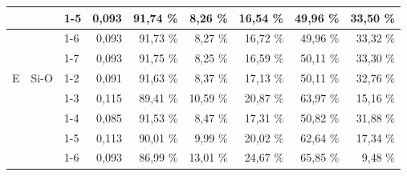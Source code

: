 \documentclass[
  digital, %
  table,   %
  lof,     %
  lot,     %
  oneside,
]{fithesis3}
\begin{document}
\begin{table}
\begin{center}
\begin{tabular}{|l|l|l|r|r|r|r|r|r|}
 &  & 1-5  & 0,093 & 91,74 \% & 8,26 \% & 16,54 \% & 49,96 \% & 33,50 \% \\ \hline
 &  & 1-6 & 0,093 & 91,73 \% & 8,27 \% & 16,72 \% & 49,96 \% & 33,32 \% \\ \hline
 &  & 1-7 & 0,093 & 91,75 \% & 8,25 \% & 16,59 \% & 50,11 \% & 33,30 \% \\ \hline
E & Si-O & 1-2  & 0,091 & 91,63 \% & 8,37 \% & 17,13 \% & 50,11 \% & 32,76 \% \\ \hline
 &  & 1-3  & 0,115 & 89,41 \% & 10,59 \% & 20,87 \% & 63,97 \% & 15,16 \% \\ \hline
 &  & 1-4  & 0,085 & 91,53 \% & 8,47 \% & 17,31 \% & 50,82 \% & 31,88 \% \\ \hline
 &  & 1-5  & 0,113 & 90,01 \% & 9,99 \% & 20,02 \% & 62,64 \% & 17,34 \% \\ \hline
 &  & 1-6 & 0,093 & 86,99 \% & 13,01 \% & 24,67 \% & 65,85 \% & 9,48 \% \\ \hline
\end{tabular}
\end{center}
\label{nbo_large}
\end{table}
\end{document}
